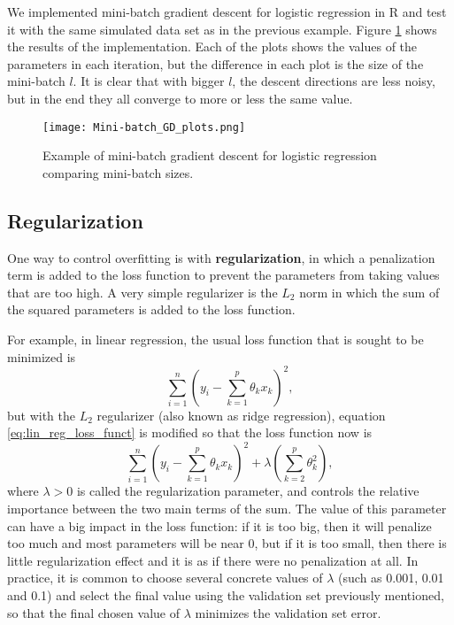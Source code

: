 We implemented mini-batch gradient descent for logistic regression in R and test it with the same simulated data set as in the previous example. Figure \ref{fig:Mini-batch_GD_plots} shows the results of the implementation. Each of the plots shows the values of the parameters in each iteration, but the difference in each plot is the size of the mini-batch $l$. It is clear that with bigger $l$, the descent directions are less noisy, but in the end they all converge to more or less the same value.

\begin{figure}[H]
    \centering
    \texttt{[image: Mini-batch\_GD\_plots.png]}
    \caption{Example of mini-batch gradient descent for logistic regression comparing mini-batch sizes.}
    \label{fig:Mini-batch_GD_plots}
\end{figure}


\subsection{Regularization}

One way to control overfitting is with \textbf{regularization}, in which a penalization term is added to the loss function to prevent the parameters from taking values that are too high. A very simple regularizer is the $L_2$ norm in which the sum of the squared parameters is added to the loss function.

For example, in linear regression, the usual loss function that is sought to be minimized is
\begin{equation}
  \label{eq:lin_reg_loss_funct}
  \sum_{i = 1}^n{ \left( y_i - \sum_{k = 1}^p  \theta_k x_k \right) ^ 2},
\end{equation}
but with the $L_2$ regularizer (also known as ridge regression), equation \eqref{eq:lin_reg_loss_funct} is modified so that the loss function now is
\begin{equation}
  \label{eq:lin_reg_loss_funct_reg}
  \sum_{i = 1}^n{ \left( y_i - \sum_{k = 1}^p \theta_k x_k \right) ^ 2}
  + \lambda \left( \sum_{k = 2}^p \theta_k^2 \right),
\end{equation}
where $\lambda > 0$ is called the regularization parameter, and controls the relative importance between the two main terms of the sum. The value of this parameter can have a big impact in the loss function: if it is too big, then it will penalize too much and most parameters will be near 0, but if it is too small, then there is little regularization effect and it is as if there were no penalization at all. In practice, it is common to choose several concrete values of $\lambda$ (such as 0.001, 0.01 and 0.1) and select the final value using the validation set previously mentioned, so that the final chosen value of $\lambda$ minimizes the validation set error.

